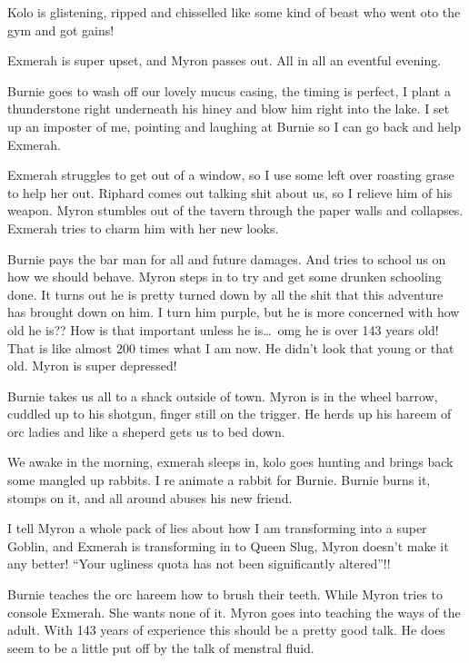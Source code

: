 Kolo is glistening, ripped and chisselled like some kind of beast who went oto the gym and got gains!\medskip

Exmerah is super upset, and Myron passes out. All in all an eventful evening.\medskip

Burnie goes to wash off our lovely mucus casing, the timing is perfect, I plant a thunderstone right underneath his hiney and blow him right into the lake. I set up an imposter of me, pointing and laughing at Burnie so I can go back and help Exmerah.\medskip

Exmerah struggles to get out of a window, so I use some left over roasting grase to help her out. Riphard comes out talking shit about us, so I relieve him of his weapon. Myron stumbles out of the tavern through the paper walls and collapses. Exmerah tries to charm him with her new looks.\medskip

Burnie pays the bar man for all and future damages. And tries to school us on how we should behave. Myron steps in to try and get some drunken schooling done. It turns out he is pretty turned down by all the shit that this adventure has brought down on him. I turn him purple, but he is more concerned with how old he is?? How is that important unless he is\ldots\ omg he is over 143 years old! That is like almost 200 times what I am now. He didn't look that young or that old. Myron is super depressed!\medskip

Burnie takes us all to a shack outside of town. Myron is in the wheel barrow, cuddled up to his shotgun, finger still on the trigger. He herds up his hareem of orc ladies and like a sheperd gets us to bed down.\medskip

We awake in the morning, exmerah sleeps in, kolo goes hunting and brings back some mangled up rabbits. I re animate a rabbit for Burnie. Burnie burns it, stomps on it, and all around abuses his new friend.\medskip

I tell Myron a whole pack of lies about how I am transforming into a super Goblin, and Exmerah is transforming in to Queen Slug, Myron doesn't make it any better! ``Your ugliness quota has not been significantly altered''!!\medskip

Burnie teaches the orc hareem how to brush their teeth. While Myron tries to console Exmerah. She wants none of it. Myron goes into teaching the ways of the adult. With 143 years of experience this should be a pretty good talk. He does seem to be a little put off by the talk of menstral fluid.\medskip

